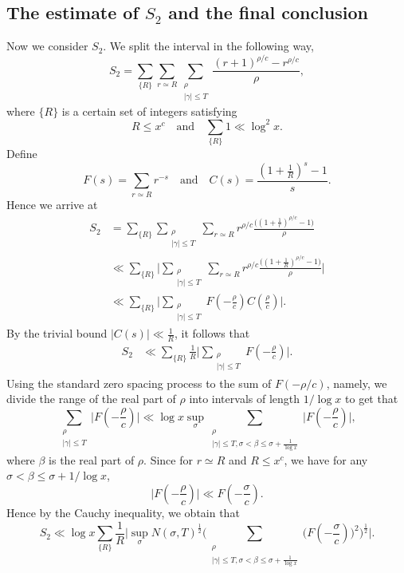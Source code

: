 \documentclass[12pt, reqno, twoside, letterpaper]{amsart}
\numberwithin{equation}{section}
\theoremstyle{customthm}
\theoremstyle{customrem}
\begin{document}
\subsection{The estimate of $S_2$ and the final conclusion}
Now we consider $S_2$. We split the interval in the following way,
$$
S_2=\sum_{\{R\}}\sum_{r\simeq R} \sum_{\substack{\rho \\ |\gamma| \leqslant T}}\frac{(r+1)^{\rho/c}-r^{\rho/c}}{\rho},
$$
where $\{R\}$ is a certain set of integers satisfying
$$
R \leqslant x^c \quad \text{and} \quad \sum_{\{R\}}1 \ll \log^2x.
$$
Define 
$$
F(s)=\sum_{r\simeq R}r^{-s} \quad \text{and} \quad C(s)=\frac{(1+\frac{1}{R})^{s}-1}{s}.
$$
Hence we arrive at
\begin{align*}
S_2 &= \sum_{\{R\}}\sum_{\substack{\rho \\ |\gamma|\leqslant T}} \sum_{r\simeq R} r^{\rho/c} \frac{\big( (1+\frac{1}{r})^{\rho/c} -1 \big)}{\rho} \\
& \ll \sum_{\{R\}} \bigg| \sum_{\substack{\rho \\ |\gamma|\leqslant T}} \sum_{r\simeq R} r^{\rho/c} \frac{\big( (1+\frac{1}{R})^{\rho/c} -1 \big)}{\rho} \bigg| \\
& \ll \sum_{\{R\}} \bigg| \sum_{\substack{\rho \\ |\gamma|\leqslant T}} F(-\frac{\rho}{c})C(\frac{\rho}{c}) \bigg|.
\end{align*}
By the trivial bound $|C(s)|\ll \frac{1}{R}$, it follows that
\begin{align*}
S_2&\ll \sum_{\{R\}}\frac{1}{R}\Big|\sum_{\substack{\rho \\ |\gamma|\leqslant T}}F(-\frac{\rho}{c})\Big|.
\end{align*}
Using the standard zero spacing process to the sum of $F(-\rho/c)$, namely, we divide the range of the real part of $\rho$ into intervals of length $1/\log x$ to get that
$$
\sum_{\substack{\rho \\ |\gamma|\leqslant T}}\Big|F(-\frac{\rho}{c}) \Big| \ll \log x \sup_{\sigma} \sum_{\substack{\rho \\ |\gamma| \leqslant T , \sigma < \beta \leqslant \sigma + \frac{1}{\log x}}}\Big|F(-\frac{\rho}{c}) \Big|,
$$
where $\beta$ is the real part of $\rho$. Since for $r\simeq R$ and $R \leqslant x^c$, we have for any $\sigma < \beta \leqslant \sigma + 1/\log x$, 
$$
\big| F(-\frac{\rho}{c}) \big| \ll F(-\frac{\sigma}{c}).
$$
Hence by the Cauchy inequality, we obtain that
$$
S_2 \ll \log x\sum_{\{R\}}\frac{1}{R}\bigg| \sup_{\sigma}N(\sigma,T)^{\frac{1}{2}} \bigg(\sum_{\substack{\rho \\ |\gamma|\leqslant T, \sigma < \beta \leqslant \sigma + \frac{1}{\log x}}}\Big(F(-\frac{\sigma}{c}) \Big)^2\bigg)^{\frac{1}{2}}\bigg|.
$$
\end{document}
